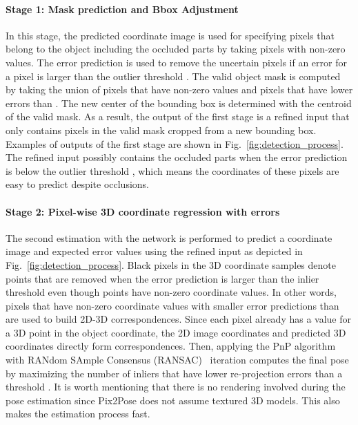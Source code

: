 \documentclass[10pt,twocolumn,letterpaper]{article}
\begin{document}
\paragraph{Stage 1: Mask prediction and Bbox Adjustment}
In this stage, the predicted coordinate image  is used for specifying pixels that belong to the object including the occluded parts by taking pixels with non-zero values. The error prediction is used to remove the uncertain pixels if an error for a pixel is larger than the outlier threshold . The valid object mask is computed by taking the union of pixels that have non-zero values and pixels that have lower errors than . The new center of the bounding box is determined with the centroid of the valid mask. As a result, the output of the first stage is a refined input that only contains pixels in the valid mask cropped from a new bounding box. Examples of outputs of the first stage are shown in Fig.~\ref{fig:detection_process}. The refined input possibly contains the occluded parts when the error prediction is below the outlier threshold , which means the coordinates of these pixels are easy to predict despite occlusions. 



\paragraph{Stage 2: Pixel-wise 3D coordinate regression with errors}
The second estimation with the network is performed to predict a coordinate image and expected error values using the refined input as depicted in Fig.~\ref{fig:detection_process}. Black pixels in the 3D coordinate samples denote points that are removed when the error prediction is larger than the inlier threshold  even though points have non-zero coordinate values. In other words, pixels that have non-zero coordinate values with smaller error predictions than  are used to build 2D-3D correspondences. Since each pixel already has a value for a 3D point in the object coordinate, the 2D image coordinates and predicted 3D coordinates directly form correspondences. Then, applying the PnP algorithm~\cite{Lepetit2008epnp} with RANdom SAmple Consensus (RANSAC)~\cite{Ransac} iteration computes the final pose by maximizing the number of inliers that have lower re-projection errors than a threshold . It is worth mentioning that there is no rendering involved during the pose estimation since Pix2Pose does not assume textured 3D models. This also makes the estimation process fast. 
\end{document}
